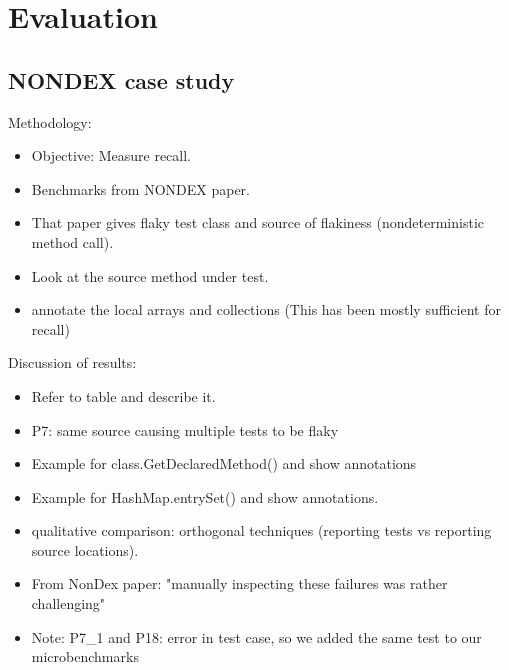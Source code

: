 \section{Evaluation}
\subsection{NONDEX case study}
Methodology:
\begin{itemize}
    \item Objective: Measure recall.
    \item Benchmarks from NONDEX paper.
    \item That paper gives flaky test class and source of flakiness (nondeterministic method call).
    \item Look at the source method under test.
    \item annotate the local arrays and collections (This has been mostly sufficient for recall)
\end{itemize}

Discussion of results:

\begin{itemize}
    \item Refer to table and describe it.
    \item P7: same source causing multiple tests to be flaky
    \item Example for class.GetDeclaredMethod() and show annotations
    \item Example for HashMap.entrySet() and show annotations.
    \item qualitative comparison: orthogonal techniques (reporting tests vs reporting source locations).
    \item From NonDex paper: "manually inspecting these failures was rather challenging"
    \item Note: P7\_1 and P18: error in test case, so we added the same test to our microbenchmarks
\end{itemize}

